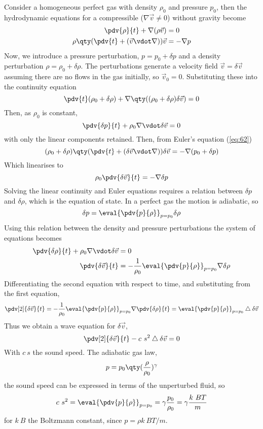 Consider a homogeneous perfect gas with density $\rho_0$ and pressure
$p_0$, then the hydrodynamic equations for a compressible ($\nabla
\vec{v} \neq 0$) without gravity become
\begin{subequations}
  \begin{align}
\label{eq:61}
    \pdv{\rho}{t} + \nabla(\rho \vec{v}) &= 0 \\
\label{eq:62}
\rho \qty( \pdv{t} + (\vec{v} \vdot \nabla) ) \vec{v} &= - \nabla p
  \end{align}
\end{subequations}
Now, we introduce a pressure perturbation, $p = p_0 + \delta p$ and a
density perturbation $\rho = \rho_0 + \delta \rho$. The perturbations
generate a velocity field $\vec{v} = \delta \vec{v}$ assuming there
are no flows in the gas initially, so $\vec{v}_0 = 0$. Substituting
these into the continuity equation
\begin{equation}
  \label{eq:60}
  \pdv{t}(\rho_0 + \delta \rho) + \nabla \qty( (\rho_0 + \delta \rho) \delta \vec{v}) = 0
\end{equation}
Then, as $\rho_0$ is constant,
\[ \pdv{\delta p}{t} + \rho_0 \nabla \vdot \delta \vec{v} = 0 \] with
only the linear components retained. Then, from Euler's equation (\ref{eq:62})
\[ (\rho_0 + \delta \rho) \qty( \pdv{t} + (\delta \vec{v} \vdot \nabla)) \delta \vec{v} = - \nabla (p_0 + \delta p) \]
Which linearises to
\begin{equation}
  \label{eq:64}
  \rho_0 \pdv{\delta \vec{v}}{t} = - \nabla \delta p
\end{equation}
Solving the linear continuity and Euler equations requires a relation
between $\delta p$ and $\delta \rho$, which is the equation of
state. In a perfect gas the motion is adiabatic, so
\begin{equation}
  \label{eq:65}
  \delta p = \eval{\pdv{p}{\rho}}_{p = p_0} \delta \rho
\end{equation}
Using this relation between the density and pressure perturbations the
system of equations becomes
\begin{subequations}
  \begin{align}
    \pdv{\delta \rho}{t} + \rho_0 \nabla \vdot \delta \vec{v} &= 0 \\
\pdv{\delta \vec{v}}{t} &= - \frac{1}{\rho_0} \eval{\pdv{p}{\rho}}_{p=p_0} \nabla \delta \rho
  \end{align}
\end{subequations}
Differentiating the second equation with respect to time, and
substituting from the first equation,
\[ \pdv[2]{\delta \vec{v}}{t} = - \frac{1}{\rho_0} \eval{\pdv{p}{\rho}}_{p=p_0} \nabla \pdv{\delta \rho}{t} = \eval{\pdv{p}{\rho}}_{p=p_0} \Lap \delta \vec{v} \]
Thus we obtain a wave equation for $\delta \vec{v}$, 
\begin{equation}
  \label{eq:66}
  \pdv[2]{\delta \vec{v}}{t} - c~s^2 \Lap \delta \vec{v} = 0
\end{equation}
With $c~s$ the sound speed. The adiabatic gas law,
\[ p = p_0 \qty( \frac{\rho}{\rho_0} )^{\gamma} \] the sound speed can
be expressed in terms of the unperturbed fluid, so
\[ c~s^2 = \eval{\pdv{p}{\rho}}_{p=p_0} = \gamma \frac{p_0}{\rho_0} = \gamma \frac{k~B T}{m} \]
for $k~B$ the Boltzmann constant, since $p = \rho k~B T /m$.

